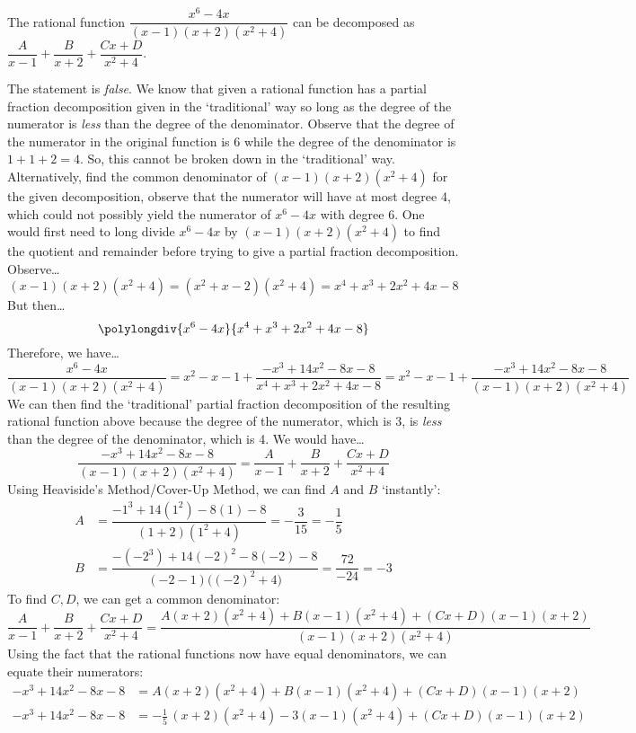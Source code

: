 \documentclass[11pt,letterpaper]{article}
\begin{document}
 The rational function $\dfrac{x^6 - 4x}{(x - 1)(x + 2)(x^2 + 4)}$ can be decomposed as $\dfrac{A}{x - 1} + \dfrac{B}{x + 2} + \dfrac{Cx + D}{x^2 + 4}$. \pspace

\sol The statement is \textit{false}. We know that given a rational function has a partial fraction decomposition given in the `traditional' way so long as the degree of the numerator is \textit{less} than the degree of the denominator. Observe that the degree of the numerator in the original function is 6 while the degree of the denominator is $1 + 1 + 2= 4$. So, this cannot be broken down in the `traditional' way. Alternatively, find the common denominator of $(x - 1)(x + 2)(x^2 + 4)$ for the given decomposition, observe that the numerator will have at most degree 4, which could not possibly yield the numerator of $x^6 - 4x$ with degree 6. One would first need to long divide $x^6 - 4x$ by $(x - 1)(x + 2)(x^2 + 4)$ to find the quotient and remainder before trying to give a partial fraction decomposition. Observe\dots
	\[
	(x - 1)(x + 2)(x^2 + 4)= (x^2 + x - 2)(x^2 + 4)= x^4 + x^3 + 2x^2 + 4x - 8
	\]
But then\dots
	\[
	\polylongdiv{x^6 - 4x}{x^4 + x^3 + 2x^2 + 4x - 8}
	\]
Therefore, we have\dots
	\[
	\dfrac{x^6 - 4x}{(x - 1)(x + 2)(x^2 + 4)}= x^2 - x - 1 + \dfrac{-x^3 + 14x^2 - 8x - 8}{x^4 + x^3 + 2x^2 + 4x - 8}= x^2 - x - 1 + \dfrac{-x^3 + 14x^2 - 8x - 8}{(x - 1)(x + 2)(x^2 + 4)}
	\]
We can then find the `traditional' partial fraction decomposition of the resulting rational function above because the degree of the numerator, which is 3, is \textit{less} than the degree of the denominator, which is 4. We would have\dots
	\[
	\dfrac{-x^3 + 14x^2 - 8x - 8}{(x - 1)(x + 2)(x^2 + 4)}= \dfrac{A}{x - 1} + \dfrac{B}{x + 2} + \dfrac{Cx + D}{x^2 + 4}
	\]
Using Heaviside's Method/Cover-Up Method, we can find $A$ and $B$ `instantly':
	\[
	\begin{aligned}
	A&= \dfrac{-1^3 + 14(1^2) - 8(1) - 8}{(1 + 2)(1^2 + 4)}= -\dfrac{3}{15}= -\dfrac{1}{5} \\[0.2cm]
	B&= \dfrac{-(-2^3) + 14(-2)^2 - 8(-2) - 8}{(-2 - 1) \big( (-2)^2 + 4 \big)}= \dfrac{72}{-24}= -3
	\end{aligned}
	\]
To find $C, D$, we can get a common denominator:
	\[
	\dfrac{A}{x - 1} + \dfrac{B}{x + 2} + \dfrac{Cx + D}{x^2 + 4}= \dfrac{A(x + 2)(x^2 + 4) + B(x - 1)(x^2 + 4) + (Cx + D)(x - 1)(x + 2)}{(x - 1)(x + 2)(x^2 + 4)}
	\]
Using the fact that the rational functions now have equal denominators, we can equate their numerators:
	\[
	\begin{aligned}
	-x^3 + 14x^2 - 8x - 8&= A(x + 2)(x^2 + 4) + B(x - 1)(x^2 + 4) + (Cx + D)(x - 1)(x + 2) \\[0.2cm]
	-x^3 + 14x^2 - 8x - 8&=-\frac{1}{5}\, (x + 2)(x^2 + 4) - 3(x - 1)(x^2 + 4) + (Cx + D)(x - 1)(x + 2) \\
	\end{aligned}
	\]
\end{document}
